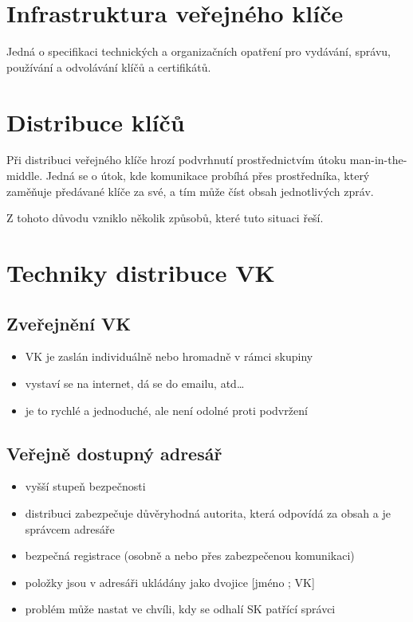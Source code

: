 \documentclass{szzclass}
\begin{document}
\tableofcontents
\newpage

\section{Infrastruktura veřejného klíče}
Jedná o specifikaci technických a organizačních opatření pro vydávání, správu, používání
a odvolávání klíčů a certifikátů.

\section{Distribuce klíčů}
Při distribuci veřejného klíče hrozí podvrhnutí prostřednictvím útoku man-in-the-middle.
Jedná se o útok, kde komunikace probíhá přes prostředníka, který zaměňuje předávané klíče za své,
a tím může číst obsah jednotlivých zpráv.

Z tohoto důvodu vzniklo několik způsobů, které tuto situaci řeší.

\section{Techniky distribuce VK}
\subsection{Zveřejnění VK}
\begin{itemize}
  \item VK je zaslán individuálně nebo hromadně v rámci skupiny
  \item vystaví se na internet, dá se do emailu, atd\dots
  \item je to rychlé a jednoduché, ale není odolné proti podvržení
\end{itemize}
\subsection{Veřejně dostupný adresář}
\begin{itemize}
  \item vyšší stupeň bezpečnosti
  \item distribuci zabezpečuje důvěryhodná autorita, která odpovídá za obsah a je správcem adresáře
  \item bezpečná registrace (osobně a nebo přes zabezpečenou komunikaci)
  \item položky jsou v adresáři ukládány jako dvojice [jméno ; VK]
  \item problém může nastat ve chvíli, kdy se odhalí SK patřící správci
\end{itemize}
\end{document}
